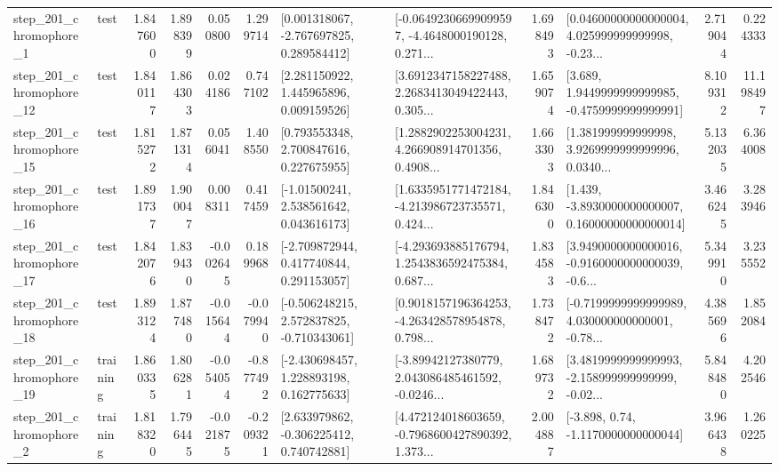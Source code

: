 \begin{tabular}{llrrrrllrlrr}
   step\_201\_chromophore\_1 &      test &      1.847600 &    1.898399 &      0.050800 &  1.299714 &    [0.001318067, -2.767697825, 0.289584412] &  [-0.06492306699099597, -4.4648000190128, 0.271... &       1.698493 &  [0.04600000000000004, 4.025999999999998, -0.23... &            2.719044 &          0.224333 \\
  step\_201\_chromophore\_12 &      test &      1.840117 &    1.864303 &      0.024186 &  0.747102 &     [2.281150922, 1.445965896, 0.009159526] &  [3.6912347158227488, 2.2683413049422443, 0.305... &       1.659074 &   [3.689, 1.9449999999999985, -0.4759999999999991] &            8.109312 &         11.198497 \\
  step\_201\_chromophore\_15 &      test &      1.815272 &    1.871314 &      0.056041 &  1.408550 &     [0.793553348, 2.700847616, 0.227675955] &  [1.2882902253004231, 4.266908914701356, 0.4908... &       1.663303 &  [1.381999999999998, 3.9269999999999996, 0.0340... &            5.132035 &          6.364008 \\
  step\_201\_chromophore\_16 &      test &      1.891737 &    1.900047 &      0.008311 &  0.417459 &     [-1.01500241, 2.538561642, 0.043616173] &  [1.6335951771472184, -4.213986723735571, 0.424... &       1.846300 &  [1.439, -3.8930000000000007, 0.16000000000000014] &            3.466245 &          3.283946 \\
  step\_201\_chromophore\_17 &      test &      1.842076 &    1.839430 &     -0.002645 &  0.189968 &    [-2.709872944, 0.417740844, 0.291153057] &  [-4.293693885176794, 1.2543836592475384, 0.687... &       1.834583 &  [3.9490000000000016, -0.9160000000000039, -0.6... &            5.349910 &          3.235552 \\
  step\_201\_chromophore\_18 &      test &      1.893124 &    1.877480 &     -0.015644 & -0.079940 &   [-0.506248215, 2.572837825, -0.710343061] &  [0.9018157196364253, -4.263428578954878, 0.798... &       1.738472 &  [-0.7199999999999989, 4.030000000000001, -0.78... &            4.385696 &          1.852084 \\
  step\_201\_chromophore\_19 &  training &      1.860335 &    1.806281 &     -0.054054 & -0.877492 &    [-2.430698457, 1.228893198, 0.162775633] &  [-3.89942127380779, 2.043086485461592, -0.0246... &       1.689732 &  [3.4819999999999993, -2.158999999999999, -0.02... &            5.848480 &          4.202546 \\
   step\_201\_chromophore\_2 &  training &      1.818320 &    1.796445 &     -0.021875 & -0.209321 &    [2.633979862, -0.306225412, 0.740742881] &  [4.472124018603659, -0.7968600427890392, 1.373... &       2.004887 &                [-3.898, 0.74, -1.1170000000000044] &            3.966438 &          1.260225 \\

\end{tabular}
